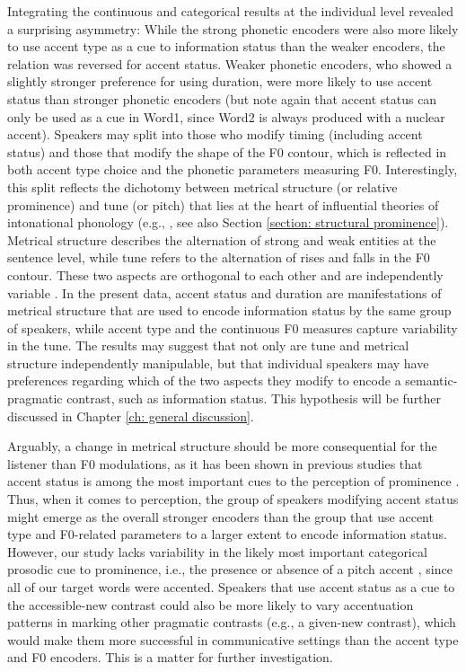 Integrating the continuous and categorical results at the individual level revealed a surprising asymmetry: While the strong phonetic encoders were also more likely to use accent type as a cue to information status than the weaker encoders, the relation was reversed for accent status. Weaker phonetic encoders, who showed a slightly stronger preference for using duration, were more likely to use accent status than stronger phonetic encoders (but note again that accent status can only be used as a cue in Word1, since Word2 is always produced with a nuclear accent). Speakers may split into those who modify timing (including accent status) and those that modify the shape of the F0 contour, which is reflected in both accent type choice and the phonetic parameters measuring F0. Interestingly, this split reflects the dichotomy between metrical structure (or relative prominence) and tune (or pitch) that lies at the heart of influential theories of intonational phonology (e.g., \citealt{laddIntonationalPhonology2008}, see also Section \ref{section: structural prominence}). Metrical structure describes the alternation of strong and weak entities at the sentence level, while tune refers to the alternation of rises and falls in the F0 contour. These two aspects are orthogonal to each other and are independently variable \citep{laddIntonationalPhonology2008}. In the present data, accent status and duration are manifestations of metrical structure that are used to encode information status by the same group of speakers, while accent type and the continuous F0 measures capture variability in the tune. The results may suggest that not only are tune and metrical structure independently manipulable, but that individual speakers may have preferences regarding which of the two aspects they modify to encode a semantic-pragmatic contrast, such as information status. This hypothesis will be further discussed in Chapter \ref{ch: general discussion}. 

Arguably, a change in metrical structure should be more consequential for the listener than F0 modulations, as it has been shown in previous studies that accent status is among the most important cues to the perception of prominence \citep{baumannWhatMakesWord2018}. Thus, when it comes to perception, the group of speakers modifying accent status might emerge as the overall stronger encoders than the group that use accent type and F0-related parameters to a larger extent to encode information status. However, our study lacks variability in the likely most important categorical prosodic cue to prominence, i.e., the presence or absence of a pitch accent \citep[e.g.,][]{baumannWhatMakesWord2018, wagnerExploitingSpeechgestureLink2019}, since all of our target words were accented. Speakers that use accent status as a cue to the accessible-new contrast could also be more likely to vary accentuation patterns in marking other pragmatic contrasts (e.g., a given-new contrast), which would make them more successful in communicative settings than the accent type and F0 encoders. This is a matter for further investigation.

